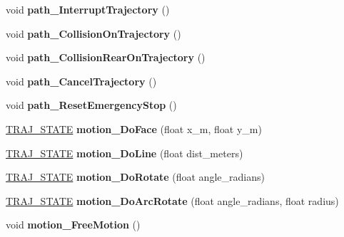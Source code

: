 \begin{DoxyCompactItemize}
void {\bfseries path\+\_\+\+Interrupt\+Trajectory} ()
\item 
\mbox{\label{classAsservDriver_a6af616f39706df060f1b81b2047c7a7f}} 
void {\bfseries path\+\_\+\+Collision\+On\+Trajectory} ()
\item 
\mbox{\label{classAsservDriver_a370b2f287b352211c07a023edcb63bc7}} 
void {\bfseries path\+\_\+\+Collision\+Rear\+On\+Trajectory} ()
\item 
\mbox{\label{classAsservDriver_a7f18af77a8524e09f8c9b024d4f0e4b8}} 
void {\bfseries path\+\_\+\+Cancel\+Trajectory} ()
\item 
\mbox{\label{classAsservDriver_aa54769b7bbe83fefa64925aa60089096}} 
void {\bfseries path\+\_\+\+Reset\+Emergency\+Stop} ()
\item 
\mbox{\label{classAsservDriver_a0e3dd8cd0074221327d049f522c35f1e}} 
\hyperlink{path__manager_8h_adb3360abeb29758da93865c8afcb80eb}{T\+R\+A\+J\+\_\+\+S\+T\+A\+TE} {\bfseries motion\+\_\+\+Do\+Face} (float x\+\_\+m, float y\+\_\+m)
\item 
\mbox{\label{classAsservDriver_a4ac101bd479baeecf76fd0d6be63421d}} 
\hyperlink{path__manager_8h_adb3360abeb29758da93865c8afcb80eb}{T\+R\+A\+J\+\_\+\+S\+T\+A\+TE} {\bfseries motion\+\_\+\+Do\+Line} (float dist\+\_\+meters)
\item 
\mbox{\label{classAsservDriver_aca1011c3fb10e594e836ea4ada6b92ff}} 
\hyperlink{path__manager_8h_adb3360abeb29758da93865c8afcb80eb}{T\+R\+A\+J\+\_\+\+S\+T\+A\+TE} {\bfseries motion\+\_\+\+Do\+Rotate} (float angle\+\_\+radians)
\item 
\mbox{\label{classAsservDriver_aabc36af66a38e2fb735e764730328994}} 
\hyperlink{path__manager_8h_adb3360abeb29758da93865c8afcb80eb}{T\+R\+A\+J\+\_\+\+S\+T\+A\+TE} {\bfseries motion\+\_\+\+Do\+Arc\+Rotate} (float angle\+\_\+radians, float radius)
\item 
\mbox{\label{classAsservDriver_aac603258c40d4c9aede0e5fce6ed4dea}} 
void {\bfseries motion\+\_\+\+Free\+Motion} ()

\end{DoxyCompactItemize}
